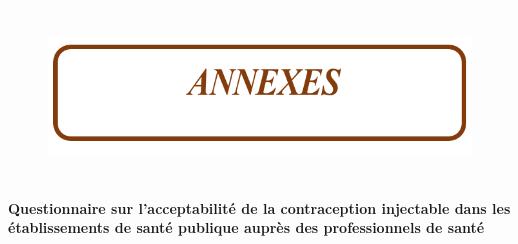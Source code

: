 
\pagebreak




\pagebreak

\begin{itemize}
  \item[\textcolor{white}{$\Box$}] 
\end{itemize}


\vspace{7cm}

\begin{figure}[H]
  \includegraphics{Images/annexes.png}
\end{figure}

\section*{}


\pagebreak

\fontsize{18}{15}\selectfont %
\noindent \textbf{Questionnaire sur l’acceptabilité de la contraception \newline injectable dans les établissements de santé publique auprès des professionnels de santé}

\fontsize{16}{20}\selectfont %


